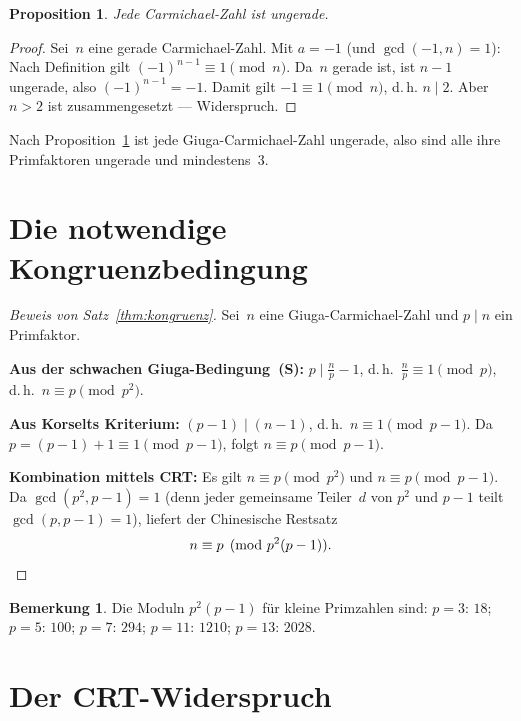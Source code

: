 \documentclass[12pt,a4paper]{amsart}
\newtheorem{proposition}[theorem]{Proposition}
\theoremstyle{definition}
\newtheorem{remark}[theorem]{Bemerkung}
\begin{document}
\begin{proposition}
\label{prop:ungerade}
Jede Carmichael-Zahl ist ungerade.
\end{proposition}

\begin{proof}
Sei~$n$ eine gerade Carmichael-Zahl. Mit $a = -1$ (und $\gcd(-1, n) = 1$):
Nach Definition gilt $(-1)^{n-1} \equiv 1 \pmod{n}$. Da~$n$ gerade ist, ist $n - 1$
ungerade, also $(-1)^{n-1} = -1$. Damit gilt $-1 \equiv 1 \pmod{n}$, d.\,h.
$n \mid 2$. Aber $n > 2$ ist zusammengesetzt — Widerspruch.
\end{proof}

Nach Proposition~\ref{prop:ungerade} ist jede Giuga-Carmichael-Zahl ungerade, also
sind alle ihre Primfaktoren ungerade und mindestens~$3$.

\section{Die notwendige Kongruenzbedingung}
\label{sec:kongruenz}

\begin{proof}[Beweis von Satz~\ref{thm:kongruenz}]
Sei~$n$ eine Giuga-Carmichael-Zahl und $p \mid n$ ein Primfaktor.

\medskip
\noindent\textbf{Aus der schwachen Giuga-Bedingung~(S):}
$p \mid \tfrac{n}{p} - 1$, d.\,h.\ $\tfrac{n}{p} \equiv 1 \pmod{p}$,
d.\,h.\ $n \equiv p \pmod{p^2}$.

\medskip
\noindent\textbf{Aus Korselts Kriterium:}
$(p-1) \mid (n-1)$, d.\,h.\ $n \equiv 1 \pmod{p-1}$.
Da $p = (p-1) + 1 \equiv 1 \pmod{p-1}$, folgt $n \equiv p \pmod{p-1}$.

\medskip
\noindent\textbf{Kombination mittels CRT:}
Es gilt $n \equiv p \pmod{p^2}$ und $n \equiv p \pmod{p-1}$.
Da $\gcd(p^2, p-1) = 1$ (denn jeder gemeinsame Teiler~$d$
von $p^2$ und $p-1$ teilt $\gcd(p, p-1) = 1$),
liefert der Chinesische Restsatz
\[
  n \equiv p \pmod{p^2(p-1)}.  \qedhere
\]
\end{proof}

\begin{remark}
Die Moduln $p^2(p-1)$ für kleine Primzahlen sind:
$p=3$: $18$; $p=5$: $100$; $p=7$: $294$; $p=11$: $1210$; $p=13$: $2028$.
\end{remark}

\section{Der CRT-Widerspruch}
\label{sec:crt}
\end{document}
